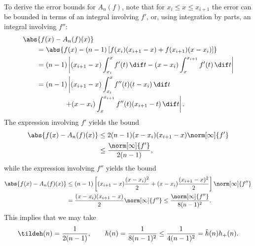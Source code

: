 To derive the error bounds for $A_n(f)$, note that for $x_{i} \le x \le x_{i+1}$ the error can be bounded in terms of an integral involving $f'$, or,  using integration by parts, an integral involving $f''$:
\begin{align*}
\MoveEqLeft{\abs{f(x)-A_n (f)(x)}}\\
&= \abs{f(x) - (n-1) \left[f(x_{i})(x_{i+1}-x) +f(x_{i+1})(x-x_i) \right]}\\
&= (n-1)\left \lvert (x_{i+1}-x) \int_{x_i}^x f'(t) \, \dif t - (x-x_i)  \int_x^{x_{i+1}} f'(t) \, \dif t\right \rvert \\
&= (n-1)\left \lvert (x_{i+1}-x) \int_{x_i}^x f''(t)(t-x_i) \, \dif t \right . \\
&\qquad \qquad \left . + (x-x_i)  \int_x^{x_{i+1}} f''(t)(x_{i+1}-t) \, \dif t\right \rvert .
\end{align*}
The expression involving $f'$ yields the bound
\begin{align*}
\abs{f(x)-A_n (f)(x)}
&\le 2 (n-1)(x-x_i)(x_{i+1}-x)\norm[\infty]{f'} \\
&\le \frac{\norm[\infty]{f'}}{2(n-1)},
\end{align*}
while the expression involving $f''$ yields the bound
\begin{align*}
\abs{f(x)-A_n (f)(x)}
&\le (n-1)\left[(x_{i+1}-x)\frac{(x-x_i)^2}{2} + (x-x_i)\frac{(x_{i+1}-x)^2}{2} \right ]\norm[\infty]{f''} \\
&=\frac{(x-x_i)(x_{i+1}-x)}2 \norm[\infty]{f''} \le \frac{\norm[\infty]{f''}}{8(n-1)^2}.
\end{align*}
This implies that we may take
\begin{equation}
\tildeh(n) =  \frac{1}{2(n-1)}, \qquad h(n) =  \frac{1}{8(n-1)^2} \leq \frac{1}{4(n-1)^2} = \tilde{h}(n) h_{+}(n).
\end{equation}

